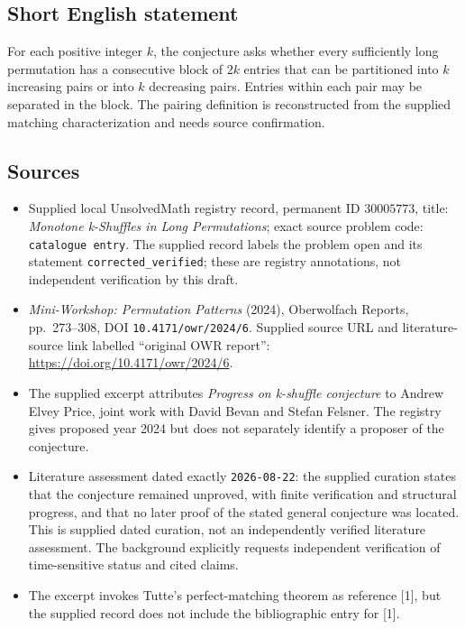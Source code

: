 \documentclass[11pt]{article}
\begin{document}
\subsection{Short English statement}
For each positive integer \(k\), the conjecture asks whether every sufficiently long permutation has a consecutive block of \(2k\) entries that can be partitioned into \(k\) increasing pairs or into \(k\) decreasing pairs. Entries within each pair may be separated in the block. The pairing definition is reconstructed from the supplied matching characterization and needs source confirmation.
\subsection{Sources}
\begin{itemize}
\item Supplied local UnsolvedMath registry record, permanent ID \(30005773\), title: \emph{Monotone k-Shuffles in Long Permutations}; exact source problem code: \texttt{catalogue entry}. The supplied record labels the problem open and its statement \texttt{corrected\_verified}; these are registry annotations, not independent verification by this draft.
\item \emph{Mini-Workshop: Permutation Patterns} (2024), Oberwolfach Reports, pp.\ 273--308, DOI \texttt{10.4171/owr/2024/6}. Supplied source URL and literature-source link labelled ``original OWR report'': \url{https://doi.org/10.4171/owr/2024/6}.
\item The supplied excerpt attributes \emph{Progress on k-shuffle conjecture} to Andrew Elvey Price, joint work with David Bevan and Stefan Felsner. The registry gives proposed year 2024 but does not separately identify a proposer of the conjecture.
\item Literature assessment dated exactly \texttt{2026-08-22}: the supplied curation states that the conjecture remained unproved, with finite verification and structural progress, and that no later proof of the stated general conjecture was located. This is supplied dated curation, not an independently verified literature assessment. The background explicitly requests independent verification of time-sensitive status and cited claims.
\item The excerpt invokes Tutte's perfect-matching theorem as reference [1], but the supplied record does not include the bibliographic entry for [1].
\end{itemize}
\end{document}
